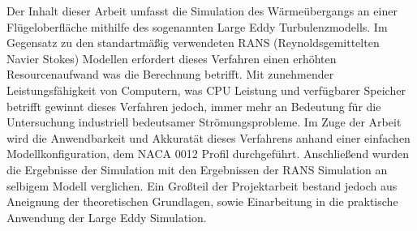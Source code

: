 Der Inhalt dieser Arbeit umfasst die Simulation des Wärmeübergangs an einer Flügeloberfläche mithilfe des sogenannten Large Eddy Turbulenzmodells. Im Gegensatz zu den standartmäßig verwendeten RANS (Reynoldsgemittelten Navier Stokes) Modellen erfordert dieses Verfahren einen erhöhten Resourcenaufwand was die Berechnung betrifft. Mit zunehmender Leistungsfähigkeit von Computern, was CPU Leistung und verfügbarer Speicher betrifft gewinnt dieses Verfahren jedoch, immer mehr an Bedeutung für die Untersuchung industriell bedeutsamer Strömungsprobleme.
Im Zuge der Arbeit wird die Anwendbarkeit und Akkuratät dieses Verfahrens anhand einer einfachen Modellkonfiguration, dem NACA 0012 Profil durchgeführt. Anschließend wurden die Ergebnisse der Simulation mit den Ergebnissen der RANS Simulation an selbigem Modell verglichen. Ein Großteil der Projektarbeit bestand jedoch aus Aneignung der theoretischen Grundlagen, sowie Einarbeitung in die praktische Anwendung der Large Eddy Simulation.
